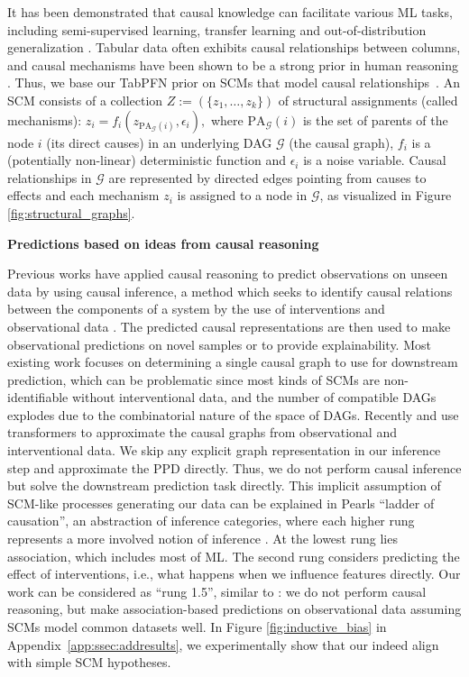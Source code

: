 It has been demonstrated that causal knowledge can facilitate various ML tasks, including semi-supervised learning, transfer learning and out-of-distribution generalization \citep{scholkopf2012causal, NEURIPS2019_2172fde4, rotenh2018}. Tabular data often exhibits causal relationships between columns, and causal mechanisms have been shown to be a strong prior in human reasoning \citep{waldmann2013causal, explanatoryvalues}. Thus, we base our TabPFN prior on SCMs that model causal relationships~\citep{pearl_2009, causalinferencelearningbook}. An SCM consists of a collection $Z := (\{z_1, \dots, z_k\})$ of structural assignments (called mechanisms): $z_i = f_i(z_{\text{PA}_{\mathcal{G}}(i)}, \epsilon_i), \label{scm_eq}$
where $\text{PA}_{\mathcal{G}}(i)$ is the set of parents of the node $i$ (its direct causes) in an underlying DAG $\mathcal{G}$ (the causal graph), $f_i$ is a (potentially non-linear) deterministic function and $\epsilon_i$ is a noise variable. Causal relationships in $\mathcal{G}$ are represented by directed edges pointing from causes to effects and each mechanism $z_i$ is assigned to a node in $\mathcal{G}$, as visualized in Figure \ref{fig:structural_graphs}.

\textbf{Predictions based on ideas from causal reasoning~~~}

Previous works have applied causal reasoning to predict observations on unseen data by using causal inference, a method which seeks to identify causal relations between the components of a system by the use of interventions and observational data \citep{pearl2010causal, PearlMackenzie18, lin2021scoping}. The predicted causal representations are then used to make observational predictions on novel samples or to provide explainability. Most existing work focuses on determining a single causal graph to use for downstream prediction, which can be problematic since most kinds of SCMs are non-identifiable without interventional data, and the number of compatible DAGs explodes due to the combinatorial nature of the space of DAGs. Recently \citet{ke2022} and \citet{lorch2022amortized} use transformers to approximate the causal graphs from observational and interventional data. We skip any explicit graph representation in our inference step and approximate the PPD directly. Thus, we do not perform causal inference but solve the downstream prediction task directly. This implicit assumption of SCM-like processes generating our data can be explained in Pearl\textquotesingle{}s ``ladder of causation'', an abstraction of inference categories, where each higher rung represents a more involved notion of inference \citep{PearlMackenzie18}. At the lowest rung lies association, which includes most of ML. The second rung considers predicting the effect of interventions, i.e., what happens when we influence features directly. Our work can be considered as ``rung 1.5'', similar to \cite{NEURIPS2020_1068bceb, SchaarMiracleCDL}: we do not perform causal reasoning, but make association-based predictions on observational data assuming SCMs model common datasets well. In Figure \ref{fig:inductive_bias} in Appendix~\ref{app:ssec:addresults}, we experimentally show that our indeed align with simple SCM hypotheses.

